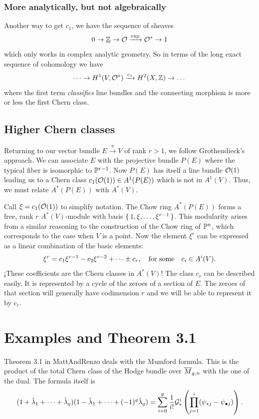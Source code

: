 \documentclass[12pt]{memoir}
\begin{document}
\subsubsection{More analytically, but not algebraically}
Another way to get $c_1$, we have the sequence of sheaves 
$$0\to\underline{\mathbb{Z}}\to\mathcal{O}\xrightarrow{\exp}\mathcal{O}^\ast\to 1$$
which only works in complex analytic geometry. So in terms of the long exact sequence of cohomology we have 
$$\dots\to H^1(V,\mathcal{O}^\ast)\xrightarrow{c_1}H^2(X,\mathbb{Z})\to\dots$$
where the first term \emph{classifies} line bundles and the connecting morphism is more or less the first Chern class. 

\subsection{Higher Chern classes}

Returning to our vector bundle $E\xrightarrow{\pi}V$ of rank $r>1$, we follow Grothendieck's approach. We can associate $E$ with the projective bundle $P(E)$ where the typical fiber is isomorphic to $\mathbb{P}^{r-1}$. Now $P(E)$ has itself a line bundle $\mathcal{O}(1)$ leading us to a Chern class $c_1(\mathcal{O}(1))\in A^1(P(E))$ which is not in $A^1(V)$. Thus, we must relate $A^\ast(P(E))$ with $A^\ast(V)$.\par
Call $\xi=c_1(\mathcal{O}(1))$ to simplify notation. The Chow ring $A^\ast(P(E))$ forms a free, rank $r$ $A^\ast(V)$-module with basis $\{\,1,\xi,\dots,\xi^{r-1}\,\}$. This modularity arises from a similar reasoning to the construction of the Chow ring of $\mathbb{P}^n$, which corresponds to the case when $V$ is a point. Now the element $\xi^r$ can be expressed as a linear combination of the basic elements: 
$$\xi^r=c_1\xi^{r-1}-c_2\xi^{r-2}+\dots\pm c_r,\quad\text{for some}\quad c_i\in A^i(V).$$
¡These coefficients are the Chern classes in $A^\ast(V)$! The class $c_r$ can be described easily. It is represented by a cycle of the zeroes of a section of $E$. The zeroes of that section will generally have codimension $r$ and we will be able to represent it by $c_r$.

\section{Examples and Theorem 3.1}

Theorem 3.1 in MattAndRenzo deals with the Mumford formula. This is the product of the total Chern class of the Hodge bundle over $\overline{M}_{g,n}$ with the one of the dual. The formula itself is 
$$(1+\hat{\lambda}_1+\dots+\hat{\lambda}_g)(1-\hat{\lambda}_1+\dots+(-1)^g\hat{\lambda}_g)=\sum_{i=0}^g\frac{1}{i!}\mathcal{G}_\ast^i\left(\prod_{j=1}^i(\psi_{\star j}-\psi_{\bullet j})\right).$$
\end{document}
